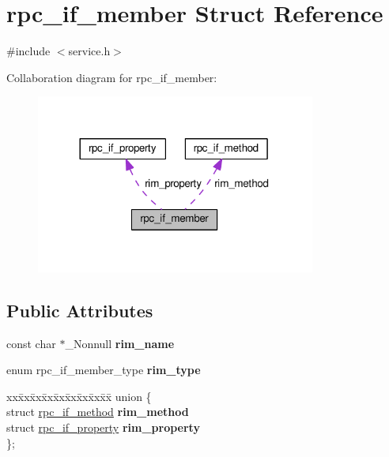 \hypertarget{structrpc__if__member}{}\section{rpc\+\_\+if\+\_\+member Struct Reference}
\label{structrpc__if__member}


{\ttfamily \#include $<$service.\+h$>$}



Collaboration diagram for rpc\+\_\+if\+\_\+member\+:
\nopagebreak
\begin{figure}[H]
\begin{center}
\leavevmode
\includegraphics[width=260pt]{structrpc__if__member__coll__graph}
\end{center}
\end{figure}
\subsection*{Public Attributes}
\begin{DoxyCompactItemize}
\item 
const char $\ast$\+\_\+\+Nonnull {\bfseries rim\+\_\+name}\hypertarget{structrpc__if__member_a656607611d627c965972e4153523287e}{}\label{structrpc__if__member_a656607611d627c965972e4153523287e}

\item 
enum rpc\+\_\+if\+\_\+member\+\_\+type {\bfseries rim\+\_\+type}\hypertarget{structrpc__if__member_a0ffdb5e81a707932149376d01c716b10}{}\label{structrpc__if__member_a0ffdb5e81a707932149376d01c716b10}

\item 
\begin{tabbing}
xx\=xx\=xx\=xx\=xx\=xx\=xx\=xx\=xx\=\kill
union \{\\
\>struct \hyperlink{structrpc__if__method}{rpc\_if\_method} {\bfseries rim\_method}\\
\>struct \hyperlink{structrpc__if__property}{rpc\_if\_property} {\bfseries rim\_property}\\
\}; \hypertarget{structrpc__if__member_a7c950b405b6852b3038ae847d0b7e2e0}{}\label{structrpc__if__member_a7c950b405b6852b3038ae847d0b7e2e0}
\\

\end{tabbing}\end{DoxyCompactItemize}


